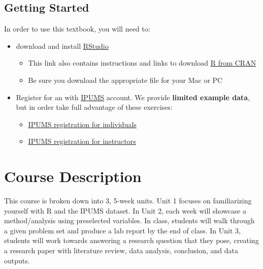\documentclass[
]{book}
\providecommand{\tightlist}{%
  \setlength{\itemsep}{0pt}\setlength{\parskip}{0pt}}
\begin{document}
\hypertarget{getting-started}{%
\section*{Getting Started}\label{getting-started}}

In order to use this textbook, you will need to:

\begin{itemize}
\tightlist
\item
  download and install \href{https://posit.co/download/rstudio-desktop/}{RStudio}

  \begin{itemize}
  \tightlist
  \item
    This link also contains instructions and links to download \href{https://cran.rstudio.com/}{R from CRAN}
  \item
    Be sure you download the appropriate file for your Mac or PC
  \end{itemize}
\item
  Register for an with \href{https://ipums.org}{IPUMS} account. We provide \textbf{limited example data}, but in order take full advantage of these exercises:

  \begin{itemize}
  \tightlist
  \item
    \href{https://international.ipums.org/international-action/menu}{IPUMS registration for individuals}
  \item
    \href{https://international.ipums.org/international/classroom_accounts.shtml}{IPUMS registration for instructors}
  \end{itemize}
\end{itemize}

\hypertarget{course-description}{%
\chapter*{Course Description}\label{course-description}}

This course is broken down into 3, 5-week units. Unit 1 focuses on familiarizing yourself with R and the IPUMS dataset. In Unit 2, each week will showcase a method/analysis using preselected variables. In class, students will walk through a given problem set and produce a lab report by the end of class. In Unit 3, students will work towards answering a research question that they pose, creating a research paper with literature review, data analysis, conclusion, and data outputs.
\end{document}
